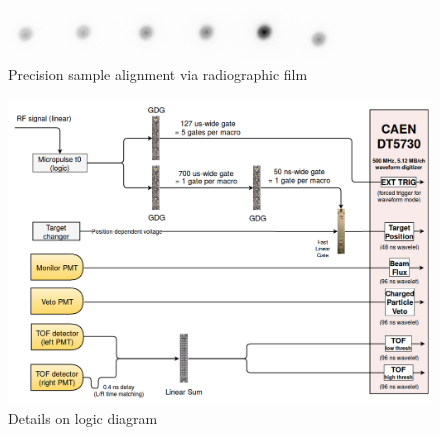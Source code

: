 \begin{figure}[h]
    \centering
    \includegraphics[width=0.8\textwidth]{figures/TargetChangerAlignment.png}
    \caption{Precision sample alignment via radiographic film}
    \label{SampleChangerAlignment}
\end{figure}

\begin{figure}[h]
    \centering
    \includegraphics[width=1.0\textwidth]{figures/TCSLogicDiagram.png}
    \caption[Logic diagram for neutron \tot\ data acquisition]
    {Details on logic diagram}
    \label{TCSLogicDiagram}
\end{figure}

\afterpage{\clearpage}
